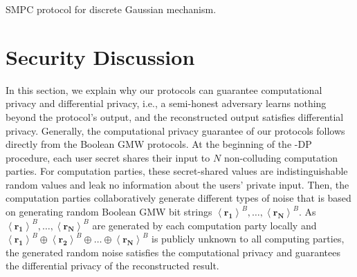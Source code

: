       \begin{protocol}[tbh!]
            \centering
            \caption{SMPC protocol for discrete Gaussian mechanism.}
            \label{prot:DGaussMechanism}
      \end{protocol}
      \FloatBarrier


      \section{Security Discussion}
      \label{SecurityDiscussion}

      In this section, we explain why our \smpc protocols can guarantee computational privacy and differential privacy, i.e., a semi-honest adversary learns nothing beyond the protocol's output, and the reconstructed output satisfies differential privacy. Generally, the computational privacy guarantee of our \smpc protocols follows directly from the Boolean GMW protocols. At the beginning of the \smpc-DP procedure, each user secret shares their input to $ N$ non-colluding computation parties. For computation parties, these secret-shared values are indistinguishable random values and leak no information about the users' private input. Then, the computation parties collaboratively generate different types of noise that is based on generating random Boolean GMW bit strings $\left\langle \boldsymbol{r_1}\right\rangle^B, \ldots, \left\langle \boldsymbol{r_{N}}\right\rangle^B $. As $\left\langle \boldsymbol{r_1}\right\rangle^B, \ldots, \left\langle \boldsymbol{r_{N}}\right\rangle^B$ are generated by each computation party locally and $\left\langle \boldsymbol{r_1}\right\rangle^B \oplus \left\langle \boldsymbol{r_2}\right\rangle^B \oplus  \ldots \oplus  \left\langle \boldsymbol{r_{N}}\right\rangle^B$ is publicly unknown to all computing parties, the generated random noise satisfies the computational privacy and guarantees the differential privacy of the reconstructed result.




